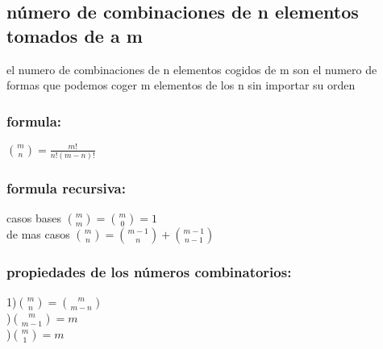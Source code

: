 \subsection{número de combinaciones de n elementos tomados de a m}
el numero de combinaciones de n elementos cogidos de m son el numero de formas que podemos coger m elementos de los n sin importar su orden\\
\subsubsection{formula:}
$\binom{m}{n}=\frac{m!}{n!(m-n)!}$
\subsubsection{formula recursiva:}
  casos bases $\binom{m}{m}=\binom{m}{0}=1$\\
  \indent de mas casos $\binom{m}{n}=\binom{m-1}{n}+\binom{m-1}{n-1}$
\subsubsection{propiedades de los números combinatorios:}
  1)$\binom{m}{n}=\binom{m}{m-n}$\\
  )$\binom{m}{m-1}=m$\\
  )$\binom{m}{1}=m$
